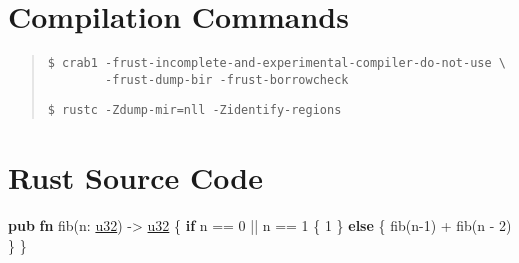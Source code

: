 \documentclass[
  11pt,
  twoside]{report}
\newenvironment{Shaded}{}{}
\newcommand{\ControlFlowTok}[1]{\textbf{#1}}
\newcommand{\DataTypeTok}[1]{\underline{#1}}
\newcommand{\DecValTok}[1]{#1}
\newcommand{\KeywordTok}[1]{\textbf{#1}}
\newcommand{\NormalTok}[1]{#1}
\newcommand{\OperatorTok}[1]{#1}
\begin{document}
\section{Compilation Commands}\label{sec:compilation-commands}

\begin{quote}
\begin{verbatim}
$ crab1 -frust-incomplete-and-experimental-compiler-do-not-use \
        -frust-dump-bir -frust-borrowcheck
\end{verbatim}

\texttt{\$\ rustc\ -Zdump-mir=nll\ -Zidentify-regions}
\end{quote}

\section{Rust Source Code}\label{sec:rust-source-code-1}

\begin{Shaded}
\begin{Highlighting}[]
\KeywordTok{pub} \KeywordTok{fn}\NormalTok{ fib(n}\OperatorTok{:} \DataTypeTok{u32}\NormalTok{) }\OperatorTok{{-}\textgreater{}} \DataTypeTok{u32} \OperatorTok{\{}
    \ControlFlowTok{if}\NormalTok{ n }\OperatorTok{==} \DecValTok{0} \OperatorTok{||}\NormalTok{ n }\OperatorTok{==} \DecValTok{1} \OperatorTok{\{}
        \DecValTok{1}
    \OperatorTok{\}} \ControlFlowTok{else} \OperatorTok{\{}
\NormalTok{        fib(n}\OperatorTok{{-}}\DecValTok{1}\NormalTok{) }\OperatorTok{+}\NormalTok{ fib(n }\OperatorTok{{-}} \DecValTok{2}\NormalTok{)}
    \OperatorTok{\}}
\OperatorTok{\}}
\end{Highlighting}
\end{Shaded}
\end{document}
